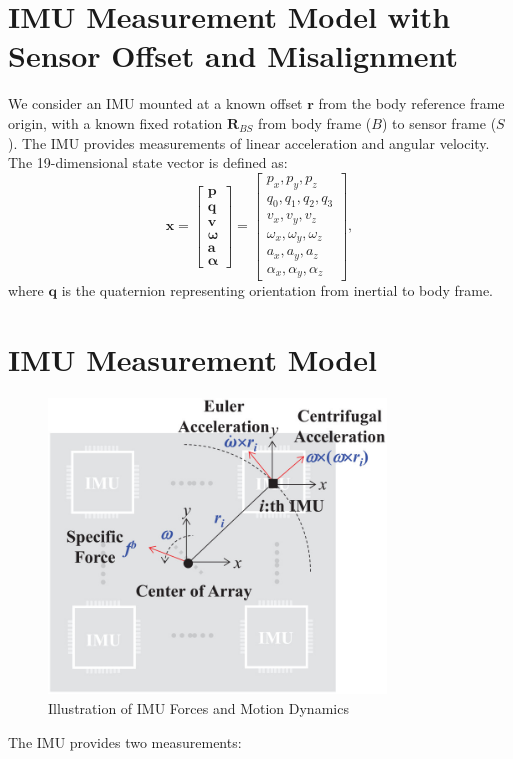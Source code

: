 \documentclass{article}
\begin{document}
	\section*{IMU Measurement Model with Sensor Offset and Misalignment}

	We consider an IMU mounted at a known offset $\mathbf{r}$ from the body reference frame origin, with a known fixed rotation $\mathbf{R}_{BS}$ from body frame ($B$) to sensor frame ($S$). The IMU provides measurements of linear acceleration and angular velocity. The 19-dimensional state vector is defined as:
	\[
	\mathbf{x} = \begin{bmatrix}
		\mathbf{p} \\
		\mathbf{q} \\
		\mathbf{v} \\
		\boldsymbol{\omega} \\
		\mathbf{a} \\
		\boldsymbol{\alpha}
	\end{bmatrix}
	=
	\begin{bmatrix}
		p_x, p_y, p_z \\
		q_0, q_1, q_2, q_3 \\
		v_x, v_y, v_z \\
		\omega_x, \omega_y, \omega_z \\
		a_x, a_y, a_z \\
		\alpha_x, \alpha_y, \alpha_z
	\end{bmatrix},
	\]
	where $\mathbf{q}$ is the quaternion representing orientation from inertial to body frame.

	\section*{IMU Measurement Model}

	\begin{figure}[h]
		\centering
		\includegraphics[width=0.8\textwidth]{imu_forces.jpeg}
		\caption{Illustration of IMU Forces and Motion Dynamics}
		\label{fig:imu_forces}
	\end{figure}
	The IMU provides two measurements:
\end{document}
